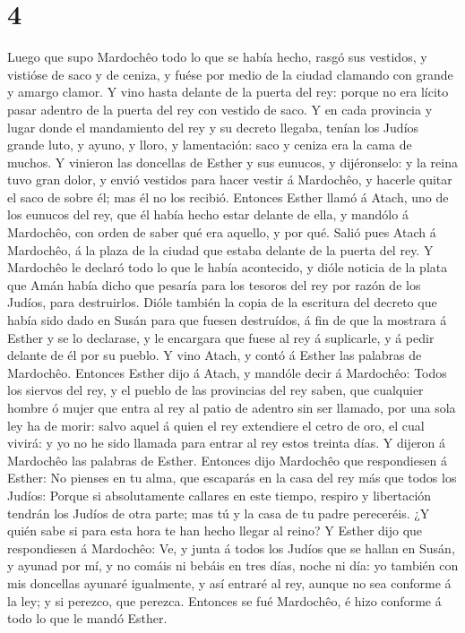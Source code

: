 \hypertarget{section-3}{%
\section{4}\label{section-3}}

 Luego que supo Mardochêo todo lo que se había hecho, rasgó
sus vestidos, y vistióse de saco y de ceniza, y fuése por medio de la
ciudad clamando con grande y amargo clamor.  Y vino hasta
delante de la puerta del rey: porque no era lícito pasar adentro de la
puerta del rey con vestido de saco.  Y en cada provincia y
lugar donde el mandamiento del rey y su decreto llegaba, tenían los
Judíos grande luto, y ayuno, y lloro, y lamentación: saco y ceniza era
la cama de muchos.  Y vinieron las doncellas de Esther y sus
eunucos, y dijéronselo: y la reina tuvo gran dolor, y envió vestidos
para hacer vestir á Mardochêo, y hacerle quitar el saco de sobre él; mas
él no los recibió.  Entonces Esther llamó á Atach, uno de
los eunucos del rey, que él había hecho estar delante de ella, y mandólo
á Mardochêo, con orden de saber qué era aquello, y por qué. 
Salió pues Atach á Mardochêo, á la plaza de la ciudad que estaba delante
de la puerta del rey.  Y Mardochêo le declaró todo lo que le
había acontecido, y dióle noticia de la plata que Amán había dicho que
pesaría para los tesoros del rey por razón de los Judíos, para
destruirlos.  Dióle también la copia de la escritura del
decreto que había sido dado en Susán para que fuesen destruídos, á fin
de que la mostrara á Esther y se lo declarase, y le encargara que fuese
al rey á suplicarle, y á pedir delante de él por su pueblo. 
Y vino Atach, y contó á Esther las palabras de Mardochêo. 
Entonces Esther dijo á Atach, y mandóle decir á Mardochêo: 
Todos los siervos del rey, y el pueblo de las provincias del rey saben,
que cualquier hombre ó mujer que entra al rey al patio de adentro sin
ser llamado, por una sola ley ha de morir: salvo aquel á quien el rey
extendiere el cetro de oro, el cual vivirá: y yo no he sido llamada para
entrar al rey estos treinta días.  Y dijeron á Mardochêo
las palabras de Esther.  Entonces dijo Mardochêo que
respondiesen á Esther: No pienses en tu alma, que escaparás en la casa
del rey más que todos los Judíos:  Porque si absolutamente
callares en este tiempo, respiro y libertación tendrán los Judíos de
otra parte; mas tú y la casa de tu padre pereceréis. ¿Y quién sabe si
para esta hora te han hecho llegar al reino?  Y Esther dijo
que respondiesen á Mardochêo:  Ve, y junta á todos los
Judíos que se hallan en Susán, y ayunad por mí, y no comáis ni bebáis en
tres días, noche ni día: yo también con mis doncellas ayunaré
igualmente, y así entraré al rey, aunque no sea conforme á la ley; y si
perezco, que perezca.  Entonces se fué Mardochêo, é hizo
conforme á todo lo que le mandó Esther.

